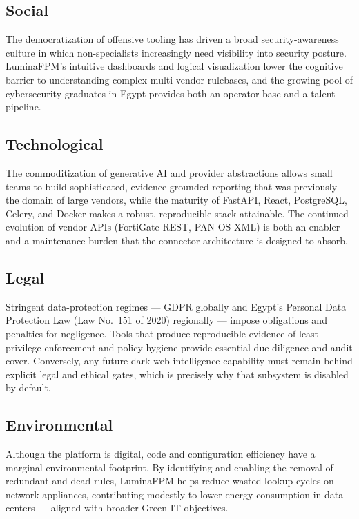 \subsection{Social}
The democratization of offensive tooling has driven a broad security-awareness culture in which non-specialists increasingly need visibility into security posture. LuminaFPM's intuitive dashboards and logical visualization lower the cognitive barrier to understanding complex multi-vendor rulebases, and the growing pool of cybersecurity graduates in Egypt provides both an operator base and a talent pipeline.

\subsection{Technological}
The commoditization of generative AI and provider abstractions allows small teams to build sophisticated, evidence-grounded reporting that was previously the domain of large vendors, while the maturity of FastAPI, React, PostgreSQL, Celery, and Docker makes a robust, reproducible stack attainable. The continued evolution of vendor APIs (FortiGate REST, PAN-OS XML) is both an enabler and a maintenance burden that the connector architecture is designed to absorb.

\subsection{Legal}
Stringent data-protection regimes --- GDPR globally and Egypt's Personal Data Protection Law (Law No.~151 of 2020) regionally --- impose obligations and penalties for negligence. Tools that produce reproducible evidence of least-privilege enforcement and policy hygiene provide essential due-diligence and audit cover. Conversely, any future dark-web intelligence capability must remain behind explicit legal and ethical gates, which is precisely why that subsystem is disabled by default.

\subsection{Environmental}
Although the platform is digital, code and configuration efficiency have a marginal environmental footprint. By identifying and enabling the removal of redundant and dead rules, LuminaFPM helps reduce wasted lookup cycles on network appliances, contributing modestly to lower energy consumption in data centers --- aligned with broader Green-IT objectives.
